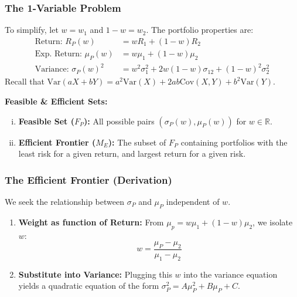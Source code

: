 \subsubsection{The 1-Variable Problem}
To simplify, let $w = w_1$ and $1-w = w_2$. The portfolio properties are:
\begin{align*}
    \text{Return: } R_P(w) &= wR_1 + (1-w)R_2 \\
    \text{Exp. Return: } \mu_P(w) &= w\mu_1 + (1-w)\mu_2 \\
    \text{Variance: } \sigma_P(w)^2 &= w^2\sigma_1^2 + 2w(1-w)\sigma_{12} + (1-w)^2\sigma_2^2
\end{align*}
Recall that $\text{Var}(aX+bY) = a^2\text{Var}(X) + 2ab\text{Cov}(X,Y) + b^2\text{Var}(Y)$.

\noindent \textbf{Feasible \& Efficient Sets:}
\begin{enumerate}[i.]
    \item \textbf{Feasible Set ($F_P$):} All possible pairs $(\sigma_P(w), \mu_P(w))$ for $w \in \mathbb{R}$.
    \item \textbf{Efficient Frontier ($M_E$):} The subset of $F_P$ containing portfolios with the least risk for a given return, and largest return for a given risk.
\end{enumerate}

\subsubsection{The Efficient Frontier (Derivation)}
We seek the relationship between $\sigma_P$ and $\mu_P$ independent of $w$.
\begin{enumerate}
    \item \textbf{Weight as function of Return:}
    From $\mu_p = w\mu_1 + (1-w)\mu_2$, we isolate $w$:
    \[ w = \frac{\mu_P - \mu_2}{\mu_1 - \mu_2} \]

    \item \textbf{Substitute into Variance:}
    Plugging this $w$ into the variance equation yields a quadratic equation of the form $\sigma_P^2 = A\mu_P^2 + B\mu_P + C$.
\end{enumerate}

